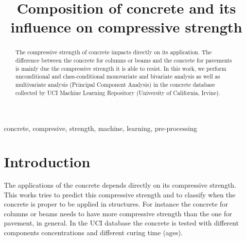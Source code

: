 \documentclass[conference]{IEEEtran}
\begin{document}
\title{Composition of concrete and its influence on compressive strength\\
}

\author{
\and
{}
}

\maketitle

\begin{abstract}
The compressive strength of concrete impacts directly on its application. The difference between the concrete for columns or beams and the concrete for pavements is mainly due the compressive strength it is able to resist. In this work, we perform unconditional and class-conditional monovariate and bivariate analysis as well as multivariate analysis (Principal Component Analysis) in the concrete database collected by UCI Machine Learning Repository (University of California, Irvine).
\end{abstract}

\begin{IEEEkeywords}
concrete, compresive, strength, machine, learning, pre-processing
\end{IEEEkeywords}

\section{Introduction}
The applications of the concrete depends directly on its compressive strength. This works tries to predict this compressive strength and to classify when the concrete is proper to be applied in structures. For instance the concrete for columns or beams needs to have more compressive strength than the one for pavement, in general. In the UCI database the concrete is tested with different components concentrations and different curing time (ages). 
\end{document}
